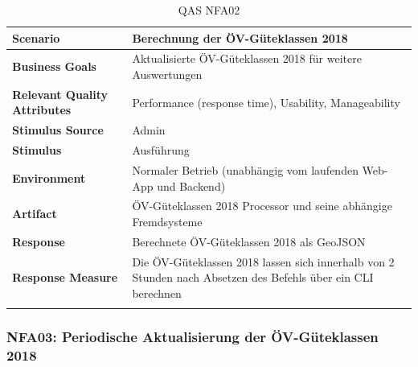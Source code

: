 \begin{longtable}{l p{10.6cm}}
        \toprule
        \textbf{Scenario}
                                & Berechnung der ÖV-Güteklassen 2018\\
        \midrule
        \textbf{Business Goals}
                                & Aktualisierte ÖV-Güteklassen 2018 für weitere Auswertungen\\
        \textbf{Relevant Quality Attributes}
                                & Performance (response time), Usability, Manageability\\
        \textbf{Stimulus Source}
                                & Admin\\
        \textbf{Stimulus}
                                & Ausführung \nameref{Use Cases:UC01}\\
        \textbf{Environment}
                                & Normaler Betrieb (unabhängig vom laufenden Web-App und Backend)\\
        \textbf{Artifact}
                                & ÖV-Güteklassen 2018 Processor und seine abhängige Fremdsysteme\\
        \textbf{Response}
                                & Berechnete ÖV-Güteklassen 2018 als GeoJSON\\  
        \textbf{Response Measure}
                                & Die ÖV-Güteklassen 2018 lassen sich innerhalb von 2 Stunden nach Absetzen des Befehls über ein CLI berechnen\\                                
        \bottomrule
    \caption{QAS NFA02}
    \label{table:nfa02}
\end{longtable}

\subsubsection{NFA03: Periodische Aktualisierung der ÖV-Güteklassen 2018}
\label{NFA:NFA03}

